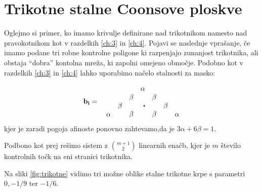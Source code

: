 \documentclass[a4paper,12pt]{article}
\begin{document}
\section{Trikotne stalne Coonsove ploskve}

Oglejmo si primer, ko imamo krivulje definirane nad trikotnikom 
namesto nad pravokotnikom kot v razdelkih \ref{ch:3} in \ref{ch:4}.
Pojavi se naslednje vprašanje, če imamo podane tri robne kontrolne poligone 
ki razpenjajo zunanjost trikotnika, ali obstaja  ``dobra''
kontolna mreža, ki zapolni omejeno območje. 
Podobno kot v razdelkih \ref{ch:3} in \ref{ch:4} lahko uporabimo načelo 
stalnosti za masko:

$$
\mathbf{b}_{\mathbf{i}} =  \quad 
\begin{matrix*}[r]
          &       &       & \alpha   &       &       & \\
          &       & \beta &          & \beta &       & \\
          &         \beta &       & \sbullet &       & \beta & \\
   \alpha &       & \beta &          & \beta &       & \alpha
\end{matrix*}
$$
kjer je zaradi pogoja afinoste ponovno zahtevamo,da je $3\alpha + 6\beta = 1$.

Podbono kot prej rešimo sistem z $\binom{m+1}{2}$ linearnih enačb, 
kjer je $m$ število kontrolnih točk na eni stranici trikotnika.

Na sliki \ref{fig:trikotne} vidimo tri možne oblike stalne trikotne
krpe s parametri $0,-1/9$ ter $-1/6$.
\end{document}
